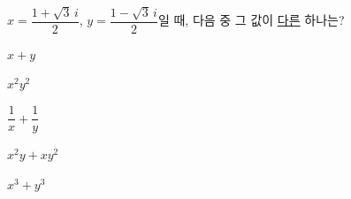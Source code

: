 $x=\dfrac{1+\sqrt{3}\,i}{2}$, $y=\dfrac{1-\sqrt{3}\,i}{2}$일 때, 다음 중 그 값이 \underline{다른} 하나는?
\begin{choices32}{\rule[-3ex]{0pt}{8ex}$x+y$}{\rule[-3ex]{0pt}{8ex}$x^2y^2$}{\rule[-3ex]{0pt}{8ex}$\dfrac{1}{x}+\dfrac{1}{y}$}{\rule[-3ex]{0pt}{8ex}$x^2y+xy^2$}{\rule[-3ex]{0pt}{8ex}$x^3+y^3$}\end{choices32}
